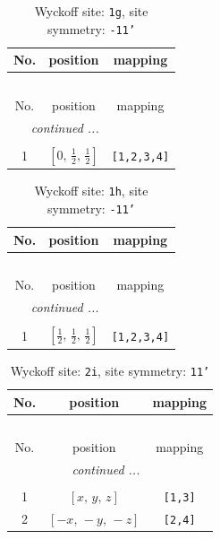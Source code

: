 \documentclass[fleqn,8pt]{jsarticle}
\begin{document}
\renewcommand{\arraystretch}{1.2}
\begin{longtable}{ccc}
\caption{Wyckoff site: {\tt 1g}, site symmetry: {\tt -11'}}
 \\
 \hline \hline
No. & position & mapping \\ \hline \endfirsthead

\multicolumn{2}{l}{\tablename\ \thetable{}} \\
 \hline \hline
No. & position & mapping \\ \hline \endhead

 \hline \hline
\multicolumn{2}{r}{\footnotesize\it continued ...} \\ \endfoot

 \hline \hline
\multicolumn{2}{r}{} \\ \endlastfoot

1 & $\left[ 0,\, \frac{1}{2},\, \frac{1}{2} \right]$ & {\tt [1,2,3,4]} \\
\end{longtable}
\renewcommand{\arraystretch}{1.2}
\begin{longtable}{ccc}
\caption{Wyckoff site: {\tt 1h}, site symmetry: {\tt -11'}}
 \\
 \hline \hline
No. & position & mapping \\ \hline \endfirsthead

\multicolumn{2}{l}{\tablename\ \thetable{}} \\
 \hline \hline
No. & position & mapping \\ \hline \endhead

 \hline \hline
\multicolumn{2}{r}{\footnotesize\it continued ...} \\ \endfoot

 \hline \hline
\multicolumn{2}{r}{} \\ \endlastfoot

1 & $\left[ \frac{1}{2},\, \frac{1}{2},\, \frac{1}{2} \right]$ & {\tt [1,2,3,4]} \\
\end{longtable}
\renewcommand{\arraystretch}{1.2}
\begin{longtable}{ccc}
\caption{Wyckoff site: {\tt 2i}, site symmetry: {\tt 11'}}
 \\
 \hline \hline
No. & position & mapping \\ \hline \endfirsthead

\multicolumn{2}{l}{\tablename\ \thetable{}} \\
 \hline \hline
No. & position & mapping \\ \hline \endhead

 \hline \hline
\multicolumn{2}{r}{\footnotesize\it continued ...} \\ \endfoot

 \hline \hline
\multicolumn{2}{r}{} \\ \endlastfoot

1 & $\left[ x,\, y,\, z \right]$ & {\tt [1,3]} \\ \hline
2 & $\left[ - x,\, - y,\, - z \right]$ & {\tt [2,4]} \\
\end{longtable}
\end{document}
